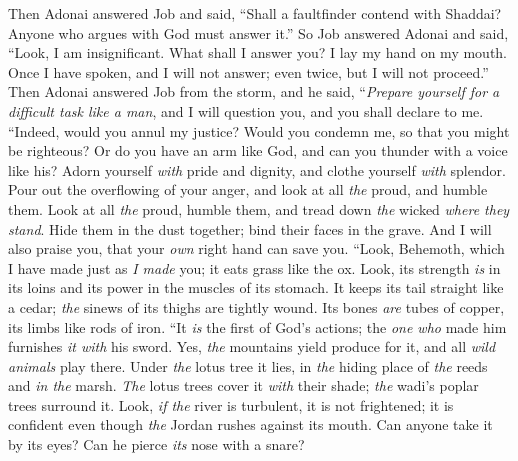 \begin{biblechapter} %
\verse Then Adonai answered Job and said,
\verse “Shall a faultfinder contend with Shaddai? 
Anyone who argues with God must answer it.”
 So Job answered Adonai and said,
\verse “Look, I am insignificant. 
What shall I answer you? 
I lay my hand on my mouth.
\verse Once I have spoken, and I will not answer; 
even twice, but I will not proceed.”
 Then Adonai answered Job from the storm, and he said,
\verse “\textit{Prepare yourself for a difficult task like a man}, 
and I will question you, and you shall declare to me.
 “Indeed, would you annul my justice? 
Would you condemn me, so that you might be righteous?
\verse Or do you have an arm like God, 
and can you thunder with a voice like his?
\verse Adorn yourself \textit{with} pride and dignity, 
and clothe yourself \textit{with} splendor.
\verse Pour out the overflowing of your anger, 
and look at all \textit{the} proud, and humble them.
\verse Look at all \textit{the} proud, humble them, 
and tread down \textit{the} wicked \textit{where they stand}.
\verse Hide them in the dust together; 
bind their faces in the grave.
\verse And I will also praise you, 
that your \textit{own} right hand can save you.
\verse “Look, Behemoth, which I have made just as \textit{I made} you; 
it eats grass like the ox.
\verse Look, its strength \textit{is} in its loins 
and its power in the muscles of its stomach.
\verse It keeps its tail straight like a cedar; 
\textit{the} sinews of its thighs are tightly wound.
\verse Its bones \textit{are} tubes of copper, 
its limbs like rods of iron.
\verse “It \textit{is} the first of God’s actions; 
the \textit{one who} made him furnishes \textit{it with} his sword.
\verse Yes, \textit{the} mountains yield produce for it, 
and all \textit{wild animals} play there.
\verse Under \textit{the} lotus tree it lies, 
in \textit{the} hiding place of \textit{the} reeds and \textit{in the} marsh.
\verse \textit{The} lotus trees cover it \textit{with} their shade; 
\textit{the} wadi’s poplar trees surround it.
\verse Look, \textit{if the} river is turbulent, it is not frightened; 
it is confident even though \textit{the} Jordan rushes against its mouth.
\verse Can anyone take it by its eyes? 
Can he pierce \textit{its} nose with a snare?
\end{biblechapter}

